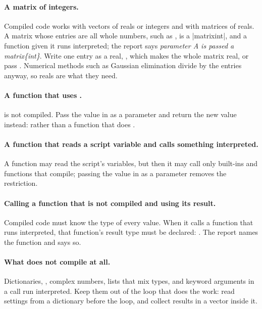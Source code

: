 \documentclass[11pt,a4paper,openany]{report}
\begin{document}
{{\paragraph{A matrix of integers.} Compiled code works with vectors of reals or
integers and with matrices of reals. A matrix whose entries are all whole
numbers, such as , is a \code|matrix{int}|, and a
function given it runs interpreted; the report says \emph{parameter A is
passed a matrix\{int\}}. Write one entry as a real, \code{[2.0, 1; 4, 3]},
which makes the whole matrix real, or pass . Numerical methods
such as Gaussian elimination divide by the entries anyway, so reals are what
they need.

\paragraph{A function that uses .}  is not
compiled. Pass the value in as a parameter and return the new value instead:
 rather than a function that does
.

\paragraph{A function that reads a script variable and calls something
interpreted.} A function may read the script's variables, but then it may
call only built-ins and functions that compile; passing the value in as a
parameter removes the restriction.

\paragraph{Calling a function that is not compiled and using its result.}
Compiled code must know the type of every value. When it calls a function
that runs interpreted, that function's result type must be declared:
. The report names the function and
says so.

\paragraph{What does not compile at all.} Dictionaries, ,
complex numbers, lists that mix types, and keyword arguments in a call run
interpreted. Keep them out of the loop that does the work: read settings from
a dictionary before the loop, and collect results in a vector inside it.

}}
\end{document}
